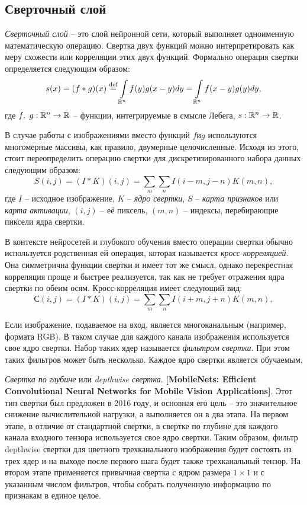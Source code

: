 \subsection{Сверточный слой} \label{par:convolution}
\textit{Сверточный слой} -- это слой нейронной сети, который выполняет одноименную математическую операцию. Свертка двух функций можно интерпретировать как меру схожести или корреляции этих двух функций. Формально операция свертки определяется следующим образом:
\begin{equation}
	s(x) = (f*g)(x) \stackrel{\text{def}}{=} \int\limits_{\RR^n} f(y)g(x-y)dy = \int\limits_{\RR^n} f(x-y)g(y)dy,
\end{equation}
где $f,\ g:\RR^n \rightarrow \RR$ -- функции, интегрируемые в смысле Лебега, $s:\RR^n \rightarrow \RR$.

В случае работы с изображениями вместо функций $f \text{и} g$ используются многомерные массивы, как правило, двумерные целочисленные. Исходя из этого, стоит переопределить операцию свертки для дискретизированного набора данных следующим образом:
\begin{equation}
	S(i,j) = (I*K)(i,j) = \sum\limits_m \sum\limits_n I(i-m,j-n)K(m,n),
\end{equation}
где $I$ -- исходное изображение, $K$ -- \textit{ядро свертки}, $S$ -- \textit{карта признаков} или \textit{карта активации}, $(i,j)$ -- её пиксель, $(m,n)$ -- индексы, перебирающие пиксели ядра свертки.

В контексте нейросетей и глубокого обучения вместо операции свертки обычно используется родственная ей операция, которая называется \textit{кросс-корреляцией}. Она симметрична функции свертки и имеет тот же смысл, однако перекрестная корреляция проще и быстрее реализуется, так как не требует отражения ядра свертки по обеим осям. Кросс-корреляция имеет следующий вид:
\begin{equation}
	С(i,j) = (I*K)(i,j) = \sum\limits_m \sum\limits_n I(i+m,j+n)K(m,n),
	\label{eq:cross-correlation}
\end{equation}

Если изображение, подаваемое на вход, является многоканальным (например, формата RGB). В таком случае для каждого канала изображения используется свое ядро свертки. Набор таких ядер называется \textit{фильтром свертки}. При этом таких фильтров может быть несколько. Каждое ядро свертки является обучаемым.

\textit{Свертка по глубине} или \textit{depthwise свертка}. \textbf{[MobileNets: Efficient Convolutional Neural Networks for Mobile Vision Applications]}. Этот тип свертки был предложен в 2016 году, и основная его цель -- это значительное снижение вычислительной нагрузки, а выполняется он в два этапа. На первом этапе, в отличие от стандартной свертки, в свертке по глубине для каждого канала входного тензора используется свое ядро свертки. Таким образом, фильтр depthwise свертки для цветного трехканального изображения будет состоять из трех ядер и на выходе после первого шага будет также трехканальный тензор. На втором этапе применяется привычная свертка с ядром размера $1 \times 1$ и с указанным числом фильтров, чтобы собрать полученную информацию по признакам в единое целое.

